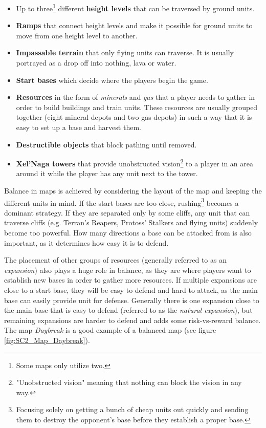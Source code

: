 \begin{itemize}

	\item Up to three\footnote{Some maps only utilize two.} different \textbf{height levels} that can be traversed by ground units.

	\item \textbf{Ramps} that connect height levels and make it possible for ground units to move from one height level to another.

	\item \textbf{Impassable terrain} that only flying units can traverse. It is usually portrayed as a drop off into nothing, lava or water.

	\item \textbf{Start bases} which decide where the players begin the game.

	\item \textbf{Resources} in the form of \textit{minerals} and \textit{gas} that a player needs to gather in order to build buildings and train units. These resources are usually grouped together (eight mineral depots and two gas depots) in such a way that it is easy to set up a base and harvest them.

	\item \textbf{Destructible objects} that block pathing until removed.

	\item \textbf{Xel'Naga towers} that provide unobstructed vision\footnote{"Unobstructed vision" meaning that nothing can block the vision in any way.} to a player in an area around it while the player has any unit next to the tower.

\end{itemize}

Balance in maps is achieved by considering the layout of the map and keeping the different units in mind. If the start bases are too close, rushing\footnote{Focusing solely on getting a bunch of cheap units out quickly and sending them to destroy the opponent's base before they establish a proper base.} becomes a dominant strategy. If they are separated only by some cliffs, any unit that can traverse cliffs (e.g. Terran's Reapers, Protoss' Stalkers and flying units) suddenly become too powerful. How many directions a base can be attacked from is also important, as it determines how easy it is to defend.

The placement of other groups of resources (generally referred to as an \textit{expansion}) also plays a huge role in balance, as they are where players want to establish new bases in order to gather more resources. If multiple expansions are close to a start base, they will be easy to defend and hard to attack, as the main base can easily provide unit for defense. Generally there is one expansion close to the main base that is easy to defend (referred to as the \textit{natural expansion}), but remaining expansions are harder to defend and adds some risk-vs-reward balance. The map \textit{Daybreak} is a good example of a balanced map (see figure \ref{fig:SC2_Map_Daybreak}).

